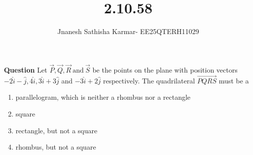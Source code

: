 \documentclass[journal]{IEEEtran}
\theoremstyle{remark}
\begin{document}
\setlength{\abovedisplayskip}{0pt}
\setlength{\belowdisplayskip}{0pt}
\setlength{\abovedisplayshortskip}{0pt}
\setlength{\belowdisplayshortskip}{0pt}

\onecolumn

\title{2.10.58}
\author{Jnanesh Sathisha Karmar- EE25QTERH11029}
\maketitle


\renewcommand{\thefigure}{\theenumi}
\renewcommand{\thetable}{\theenumi}
\textbf{Question} Let $\vec{P},\vec{Q},\vec{R}\  \text{and}\  \vec{S}$ be the points on the plane with position vectors $-2\hat{i} -\hat{j}, 4\hat{i}, 3\hat{i} + 3\hat{j}$
and $-3\hat{i} + 2\hat{j}$ respectively. The quadrilateral $\vec{PQRS}$ must be a
\begin{enumerate}
    \item parallelogram, which is neither a rhombus nor a rectangle
    \item square
    \item rectangle, but not a square
    \item rhombus, but not a square
\end{enumerate}
\end{document}

